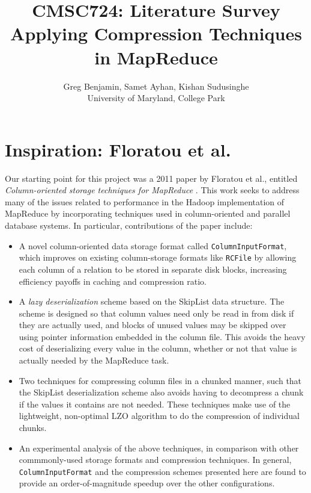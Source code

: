 \documentclass[twocolumn]{article}
\title{CMSC724: Literature Survey \\
Applying Compression Techniques in MapReduce}
\author{Greg Benjamin, Samet Ayhan, Kishan Sudusinghe \\
University of Maryland, College Park}
\date{}
\begin{document}
\maketitle

\section{Inspiration: Floratou et al.}

Our starting point for this project was a 2011 paper by Floratou et al., entitled
\emph{Column-oriented storage techniques for MapReduce} \cite{ref:floratou}.  This work
seeks to address many of the issues related to performance in the Hadoop implementation
of MapReduce by incorporating techniques used in column-oriented and parallel database
systems.  In particular, contributions of the paper include:

\begin{itemize}
\item A novel column-oriented data storage format called \verb+ColumnInputFormat+,
which improves on existing column-storage formats like \verb+RCFile+ \cite{ref:rcfile}
by allowing each column of a relation to be stored in separate disk blocks, increasing
efficiency payoffs in caching and compression ratio.
\item A \emph{lazy deserialization} scheme based on the SkipList \cite{ref:skiplist}
data structure.  The scheme is designed so that column values need only be read
in from disk if they are actually used, and blocks of unused values may be skipped
over using pointer information embedded in the column file.  This avoids the
heavy cost of deserializing every value in the column, whether or not that value
is actually needed by the MapReduce task.
\item Two techniques for compressing column files in a chunked manner, such that
the SkipList deserialization scheme also avoids having to decompress a chunk if
the values it contains are not needed.  These techniques make use of the lightweight,
non-optimal LZO algorithm \cite{ref:lz77} \cite{ref:lz78} to do the compression of
individual chunks.


\item An experimental analysis of the above techniques, in comparison with other
commmonly-used storage formats and compression techniques.  In general, 
\verb+ColumnInputFormat+ and the compression schemes presented here are
found to provide an order-of-magnitude speedup over the other configurations.
\end{itemize}
\end{document}

